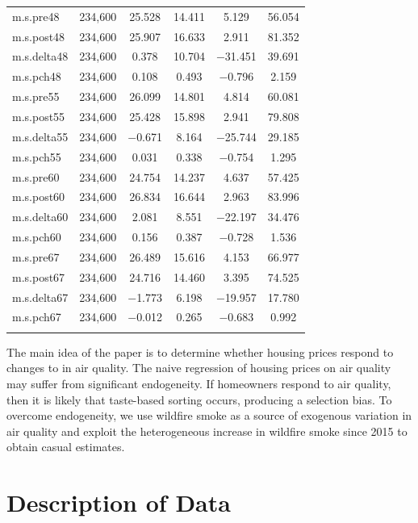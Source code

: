 \documentclass[12pt]{article}
\begin{document}
\begin{table}[!htbp]
\begin{tabular}{@{\extracolsep{5pt}}lccccc}
m.s.pre48 & 234,600 & 25.528 & 14.411 & 5.129 & 56.054 \\ 
m.s.post48 & 234,600 & 25.907 & 16.633 & 2.911 & 81.352 \\ 
m.s.delta48 & 234,600 & 0.378 & 10.704 & $-$31.451 & 39.691 \\ 
m.s.pch48 & 234,600 & 0.108 & 0.493 & $-$0.796 & 2.159 \\ 
m.s.pre55 & 234,600 & 26.099 & 14.801 & 4.814 & 60.081 \\ 
m.s.post55 & 234,600 & 25.428 & 15.898 & 2.941 & 79.808 \\ 
m.s.delta55 & 234,600 & $-$0.671 & 8.164 & $-$25.744 & 29.185 \\ 
m.s.pch55 & 234,600 & 0.031 & 0.338 & $-$0.754 & 1.295 \\ 
m.s.pre60 & 234,600 & 24.754 & 14.237 & 4.637 & 57.425 \\ 
m.s.post60 & 234,600 & 26.834 & 16.644 & 2.963 & 83.996 \\ 
m.s.delta60 & 234,600 & 2.081 & 8.551 & $-$22.197 & 34.476 \\ 
m.s.pch60 & 234,600 & 0.156 & 0.387 & $-$0.728 & 1.536 \\ 
m.s.pre67 & 234,600 & 26.489 & 15.616 & 4.153 & 66.977 \\ 
m.s.post67 & 234,600 & 24.716 & 14.460 & 3.395 & 74.525 \\ 
m.s.delta67 & 234,600 & $-$1.773 & 6.198 & $-$19.957 & 17.780 \\ 
m.s.pch67 & 234,600 & $-$0.012 & 0.265 & $-$0.683 & 0.992 \\ 
\hline \\[-1.8ex] 
\end{tabular} 
\end{table} 

The main idea of the paper is to determine whether housing prices respond to 
changes to in air quality.  The naive regression of housing prices on air quality
may suffer from significant endogeneity.  If homeowners respond to air quality, then
it is likely that taste-based sorting occurs, producing a selection bias.  To overcome endogeneity, we use wildfire smoke as a source of exogenous variation in
air quality and exploit the heterogeneous increase in wildfire smoke since 2015 to 
obtain casual estimates.

\section{Description of Data}
\end{document}
